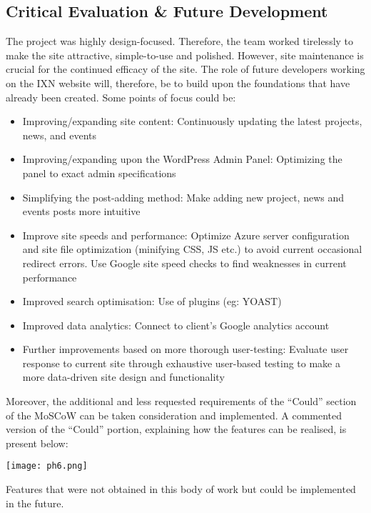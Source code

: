 \documentclass[fontsize=11pt]{extarticle}
\numberwithin{figure}{section} %
\providecommand{\tightlist}{%
  \setlength{\itemsep}{0pt}\setlength{\parskip}{0pt}}
\begin{document}
\hypertarget{critical-evaluation-future-development}{%
\subsection{Critical Evaluation \& Future
Development}\label{critical-evaluation-future-development}}

The project was highly design-focused. Therefore, the team worked
tirelessly to make the site attractive, simple-to-use and polished.
However, site maintenance is crucial for the continued efficacy of the
site.\cite{g8} The role of future developers working on the IXN website
will, therefore, be to build upon the foundations that have already been
created. Some points of focus could be:

\begin{itemize}
\tightlist
\item
  Improving/expanding site content: Continuously updating the latest
  projects, news, and events
\item
  Improving/expanding upon the WordPress Admin Panel: Optimizing the
  panel to exact admin specifications
\item
  Simplifying the post-adding method: Make adding new project, news and
  events posts more intuitive
\item
  Improve site speeds and performance: Optimize Azure server
  configuration and site file optimization (minifying CSS, JS etc.) to
  avoid current occasional redirect errors. Use Google site speed checks
  to find weaknesses in current performance
\item
  Improved search optimisation: Use of plugins (eg: YOAST)
\item
  Improved data analytics: Connect to client's Google analytics account
\item
  Further improvements based on more thorough user-testing: Evaluate
  user response to current site through exhaustive user-based testing to
  make a more data-driven site design and functionality
\end{itemize}

Moreover, the additional and less requested requirements of the
``Could'' section of the MoSCoW can be taken consideration and
implemented. A commented version of the ``Could'' portion, explaining
how the features can be realised, is present below:

\begin{table}[H]
      \centering
      \texttt{[image: ph6.png]}
      \caption{Features that were not obtained in this body of work but could be implemented in the future.}
 \end{table}
\newpage
\end{document}
